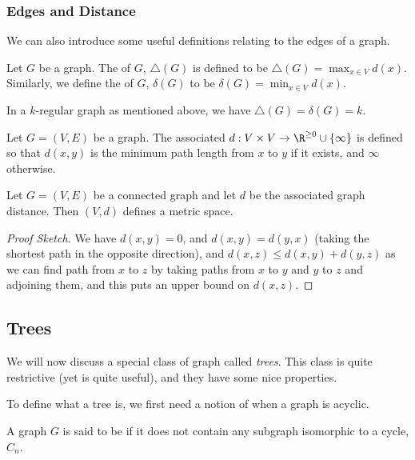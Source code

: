 \subsubsection{Edges and Distance}

We can also introduce some useful definitions relating to the edges of a graph.

\begin{definition}
	Let $G$ be a graph. The  of $G$, $\triangle(G)$ is defined to be $\triangle(G) = \max_{x \in V} d(x)$. Similarly, we define the  of $G$, $\delta(G)$ to be $\delta(G) = \min_{x \in V} d(x)$.
\end{definition}

In a $k$-regular graph as mentioned above, we have $\triangle(G) = \delta(G) = k$.

\begin{definition}
Let $G = (V, E)$ be a graph. The associated  $d: V \times V \rightarrow \R^{\geq 0} \cup \{ \infty \}$ is defined so that $d(x, y)$ is the minimum path length from $x$ to $y$ if it exists, and $\infty$ otherwise.
\end{definition}

\begin{proposition}
	Let $G = (V, E)$ be a connected graph and let $d$ be the associated graph distance. Then $(V, d)$ defines a metric space.
\end{proposition}
\begin{proof}[Proof Sketch]
	We have $d(x, y) = 0$, and $d(x, y) = d(y, x)$ (taking the shortest path in the opposite direction), and $d(x, z) \leq d(x, y) + d(y, z)$ as we can find path from $x$ to $z$ by taking paths from $x$ to $y$ and $y$ to $z$ and adjoining them, and this puts an upper bound on $d(x, z)$.
\end{proof}

\subsection{Trees}

We will now discuss a special class of graph called \emph{trees}.
This class is quite restrictive (yet is quite useful), and they have some nice properties.

To define what a tree is, we first need a notion of when a graph is acyclic.

\begin{definition}[Acyclic]
	A graph $G$ is said to be  if it does not contain any subgraph isomorphic to a cycle, $C_n$.
\end{definition}

